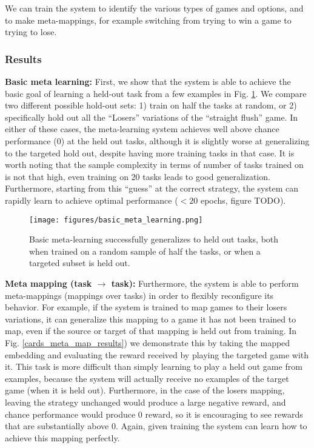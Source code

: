 \documentclass[11pt]{article}
\begin{document}
We can train the system to identify the various types of games and options, and to make meta-mappings, for example switching from trying to win a game to trying to lose. \par

\subsubsection{Results}
\begin{figure}

\end{figure}
\textbf{Basic meta learning:} First, we show that the system is able to achieve the basic goal of learning a held-out task from a few examples in Fig. \ref{cards_basic_results}. We compare two different possible hold-out sets: 1) train on half the tasks at random, or 2) specifically hold out all the ``Losers'' variations of the ``straight flush'' game. In either of these cases, the meta-learning system achieves well above chance performance (0) at the held out tasks, although it is slightly worse at generalizing to the targeted hold out, despite having more training tasks in that case. It is worth noting that the sample complexity in terms of number of tasks trained on is not that high, even training on 20 tasks leads to good generalization. Furthermore, starting from this ``guess'' at the correct strategy, the system can rapidly learn to achieve optimal performance ($< 20$ epochs, figure TODO). \par
\begin{figure}
\centering
\texttt{[image: figures/basic\_meta\_learning.png]}
\caption{Basic meta-learning successfully generalizes to held out tasks, both when trained on a random sample of half the tasks, or when a targeted subset is held out.}
\label{cards_basic_results}
\end{figure}
\textbf{Meta mapping (task $\rightarrow$ task):} Furthermore, the system is able to perform meta-mappings (mappings over tasks) in order to flexibly reconfigure its behavior. For example, if the system is trained to map games to their losers variations, it can generalize this mapping to a game it has not been trained to map, even if the source or target of that mapping is held out from training. In Fig. \ref{cards_meta_map_results}) we demonstrate this by taking the mapped embedding and evaluating the reward received by playing the targeted game with it. This task is more difficult than simply learning to play a held out game from examples, because the system will actually receive no examples of the target game (when it is held out). Furthermore, in the case of the losers mapping, leaving the strategy unchanged would produce a large negative reward, and chance performance would produce 0 reward, so it is encouraging to see rewards that are substantially above 0. Again, given training the system can learn how to achieve this mapping perfectly. \par
\end{document}
